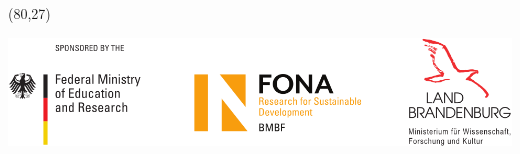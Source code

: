 \documentclass[19pt]{beamer}
\begin{document}
\begin{frame}
%
        \begin{textblock}{20}(80,27)
            \begin{WhiteBox}
                \vspace{-1cm}
                \begin{block}{}
                    \includegraphics[width=\textwidth]{img/Sponsor_logos}
                \end{block}
            \end{WhiteBox}
        \end{textblock}
    \end{frame}
\end{document}
